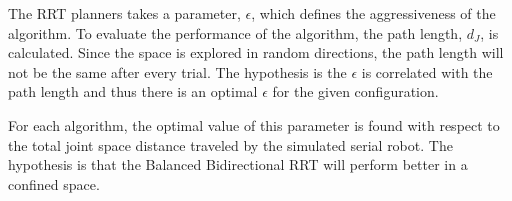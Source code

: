 The RRT planners takes a parameter, \(\epsilon\), which defines the aggressiveness of the algorithm.
To evaluate the performance of the algorithm, the path length, \(d_J\), is calculated.
Since the space is explored in random directions, the path length will not be the same after every trial.
The hypothesis is the \(\epsilon\) is correlated with the path length and thus there is an optimal \(\epsilon\) for the given configuration.

For each algorithm, the optimal value of this parameter is found with respect to the total joint space distance traveled by the simulated serial robot.
The hypothesis is that the Balanced Bidirectional RRT will perform better in a confined space. %
